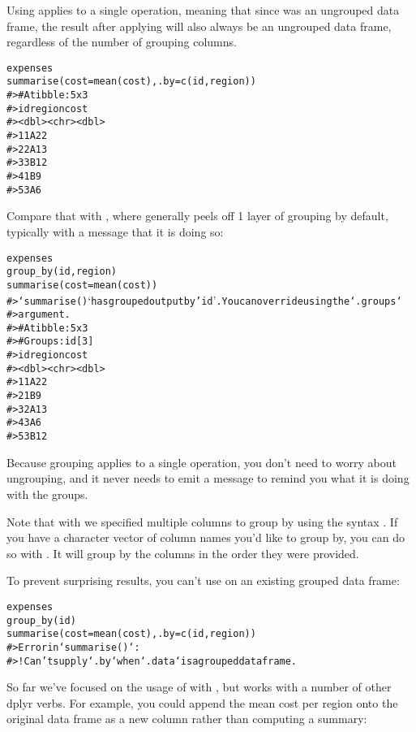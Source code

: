 \documentclass[a4paper]{book}
\begin{document}
\begin{Description}
\begin{SubSection}{Using }
 applies to a single operation, meaning that since  was an ungrouped data frame, the result after applying  will also always be an ungrouped data frame, regardless of the number of grouping columns.

\begin{alltt}expenses %>%
  summarise(cost = mean(cost), .by = c(id, region))
#> # A tibble: 5 x 3
#>      id region  cost
#>   <dbl> <chr>  <dbl>
#> 1     1 A         22
#> 2     2 A         13
#> 3     3 B         12
#> 4     1 B          9
#> 5     3 A          6
\end{alltt}


Compare that with , where  generally peels off 1 layer of grouping by default, typically with a message that it is doing so:

\begin{alltt}expenses %>%
  group_by(id, region) %>%
  summarise(cost = mean(cost))
#> `summarise()` has grouped output by 'id'. You can override using the `.groups`
#> argument.
#> # A tibble: 5 x 3
#> # Groups:   id [3]
#>      id region  cost
#>   <dbl> <chr>  <dbl>
#> 1     1 A         22
#> 2     1 B          9
#> 3     2 A         13
#> 4     3 A          6
#> 5     3 B         12
\end{alltt}


Because  grouping applies to a single operation, you don't need to worry about ungrouping, and it never needs to emit a message to remind you what it is doing with the groups.

Note that with  we specified multiple columns to group by using the  syntax .
If you have a character vector of column names you'd like to group by, you can do so with .
It will group by the columns in the order they were provided.

To prevent surprising results, you can't use  on an existing grouped data frame:

\begin{alltt}expenses %>% 
  group_by(id) %>%
  summarise(cost = mean(cost), .by = c(id, region))
#> Error in `summarise()`:
#> ! Can't supply `.by` when `.data` is a grouped data frame.
\end{alltt}


So far we've focused on the usage of  with , but  works with a number of other dplyr verbs.
For example, you could append the mean cost per region onto the original data frame as a new column rather than computing a summary:


\end{SubSection}
\end{Description}
\end{document}
